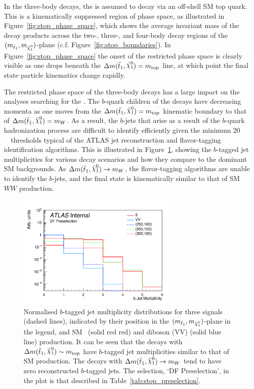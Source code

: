 In the three-body decays, the \stopone is assumed to decay via an off-shell SM top quark.
This is a kinematically suppressed region of phase space, as illustrated in Figure~\ref{fig:stop_phase_space},
which shows the average invariant mass of the \stopone decay products across the
two-, three-, and four-body decay regions of the $(m_{\stopone}, m_{\ninoone})$-plane (c.f. Figure~\ref{fig:stop_boundaries}).
In Figure~\ref{fig:stop_phase_space} the onset of the restricted phase space is clearly
visible as one drops beneath the $\sdiff = m_{\text{top}}$ line, at which point the final
state particle kinematics change rapidly.

The restricted phase space of the three-body \stopone decays has a large
impact on the analyses searching for the \stopone.
The $b$-quark children of the \stopone decays have decreasing momenta as one
moves from the $\sdiff = m_{\text{top}}$ kinematic boundary to that of $\sdiff = m_{W}$.
As a result, the $b$-jets that arise as a result of the $b$-quark hadronization process
are difficult to identify efficiently given the minimum 20\,\GeV~\pT~thresholds typical
of the ATLAS jet reconstruction and flavor-tagging identification algorithms.
This is illustrated in Figure~\ref{fig:stop_nbjets}, showing the $b$-tagged jet multiplicities
for various \stopone decay scenarios and how they compare to the dominant SM backgrounds.
As $\sdiff \rightarrow m_W$, the flavor-tagging algorithms are unable to identify the $b$-jets,
and the final state is kinematically similar to that of SM $WW$ production.

\begin{figure}[!htb]
    \begin{center}
        \includegraphics[width=0.7\textwidth]{figures/search_stop2l/strategy/comp_plots/dfpresel_nBJets}
        \caption{
            Normalised $b$-tagged jet multiplicity distributions for three \stopone signals (dashed lines),
            indicated by their position in the $(m_{\stopone}, m_{\ninoone})$-plane in the legend,
            and SM \ttbar~(solid red red) and diboson (VV) (solid blue line) production.
            It can be seen that the \stopone decays with $\sdiff \sim m_{\text{top}}$ have $b$-tagged jet
            multiplicities similar to that of SM \ttbar production.
            The \stopone decays with $\sdiff \rightarrow m_W$ tend to have zero reconstructed $b$-tagged jets.
            The selection, `DF Preselection', in the plot is that described in Table~\ref{tab:stop_preselection}.
        }
        \label{fig:stop_nbjets}
    \end{center}
\end{figure}

